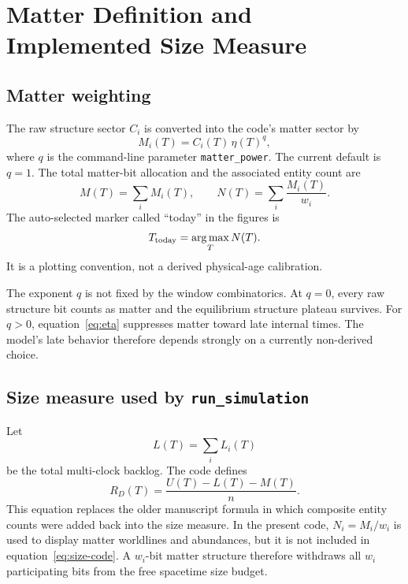 \documentclass[11pt]{article}
\begin{document}
\section{Matter Definition and Implemented Size Measure}
\label{sec:size}

\subsection{Matter weighting}

The raw structure sector $C_i$ is converted into the code's matter sector by
\begin{equation}
 M_i(T)=C_i(T)\,\eta(T)^q,
 \label{eq:matter}
\end{equation}
where $q$ is the command-line parameter \texttt{matter\_power}.  The current
default is $q=1$.  The total matter-bit allocation and the associated entity
count are
\begin{equation}
 M(T)=\sum_i M_i(T),
 \qquad
 N(T)=\sum_i\frac{M_i(T)}{w_i}.
 \label{eq:matter-total}
\end{equation}
The auto-selected marker called ``today'' in the figures is
\begin{equation}
 T_{\rm today}=\operatorname*{arg\,max}_T N(T).
 \label{eq:today}
\end{equation}
It is a plotting convention, not a derived physical-age calibration.

The exponent $q$ is not fixed by the window combinatorics.  At $q=0$, every
raw structure bit counts as matter and the equilibrium structure plateau
survives.  For $q>0$, equation~\eqref{eq:eta} suppresses matter toward late
internal times.  The model's late behavior therefore depends strongly on a
currently non-derived choice.

\subsection{Size measure used by \texttt{run\_simulation}}

Let
\begin{equation}
 L(T)=\sum_iL_i(T)
 \label{eq:pending-total}
\end{equation}
be the total multi-clock backlog.  The code defines
\begin{equation}
 \boxed{
 R_D(T)=\frac{U(T)-L(T)-M(T)}{n}.}
 \label{eq:size-code}
\end{equation}
This equation replaces the older manuscript formula in which composite
entity counts were added back into the size measure.  In the present code,
$N_i=M_i/w_i$ is used to display matter worldlines and abundances, but it is
not included in equation~\eqref{eq:size-code}.  A $w_i$-bit matter structure
therefore withdraws all $w_i$ participating bits from the free spacetime
size budget.
\end{document}
